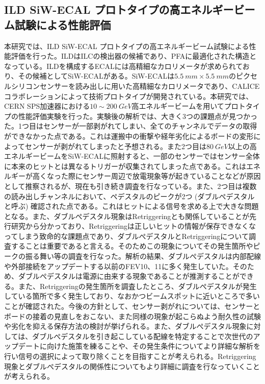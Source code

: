 \subsection*{ILD SiW-ECAL プロトタイプの高エネルギービーム試験による性能評価}
本研究では、ILD SiW-ECAL プロトタイプの高エネルギービーム試験による性能評価を行った。ILDはILCの検出器の候補であり、PFAに最適化された構造となっている。ILDを構成するECALには高精細なカロリメータが求められており、その候補としてSiW-ECALがある。SiW-ECALは$\SI{5.5}{mm} \times \SI{5.5}{mm}$のピクセルシリコンセンサーを読み出しに用いた高精細なカロリメータであり、CALICEコラボレーションによって技術プロトタイプが開発されている。本研究では、CERN SPS加速器における$10 \sim \SI{200}{GeV}$高エネルギービームを用いてプロトタイプの性能評価実験を行った。実験後の解析では、大きく3つの課題点が見つかった。1つ目はセンサーが一部剥がれてしまい、全てのチャンネルでデータの取得ができなかった点である。これは運搬中の衝撃や経年劣化によるボードの変形によってセンサーが剥がれてしまったと予想される。また2つ目は$\SI{80}{GeV}$以上の高エネルギービームをSiW-ECALに照射すると、一部のセンサーではセンサー全体に本来のヒットとは異なるトリガーが収集されてしまった点である。これはエネルギーが高くなった際にセンサー周辺で放電現象等が起きていることなどが原因として推察されるが、現在も引き続き調査を行なっている。また、2つ目は複数の読み出しチャンネルにおいて、ペデスタルのピークが2つ (ダブルぺデスタルと呼ぶ) 確認された点である。これはヒットによる信号を求める上で大きな問題となる。また、ダブルぺデスタル現象はRetriggeringとも関係していることが先行研究から分かっており、Retriggeringは正しいヒットの情報が保存できなくなってしまう致命的な課題点であり、ダブルぺデスタルとRetriggeringについて調査することは重要であると言える。そのためこの現象についてその発生箇所やピークの振る舞い等の調査を行なった。解析の結果、ダブルぺデスタルは内部配線や外部接続をアップデートする以前のFEV10、11に多く発生していた。そのため、ダブルぺデスタルは電源に由来する現象であることが推測することができる。また、Retriggeringの発生箇所を調査したところ、ダブルぺデスタルが発生している箇所で多く発生しており、なおかつビームスポットに近いところで多いことが確認された。今後の方針として、センサー剥がれについては、センサーとボードの接着の見直しをおこない、また同様の現象が起こらぬよう耐久性の試験や劣化を抑える保存方法の検討が挙げられる。また、ダブルぺデスタル現象に対しては、ダブルぺデスタルを引き起こしている配線を特定することで次世代のアップデートに向けた施策を練ることや、その発生条件についてより詳細な解析を行い信号の選択によって取り除くことを目指すことが考えられる。Retriggering現象とダブルぺデスタルの関係性についてもより詳細に調査を行なっていくことが考えられる。

